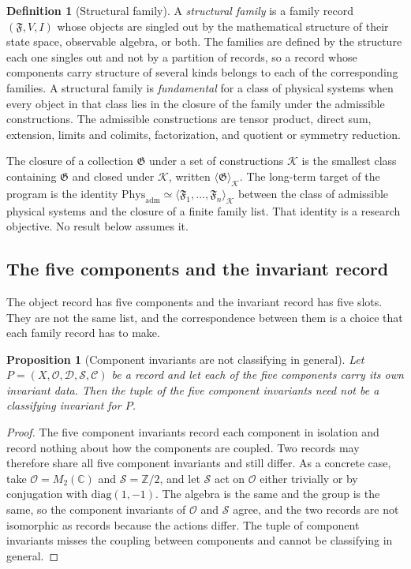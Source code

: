 \documentclass[11pt,letterpaper]{article}
\newtheorem{proposition}[theorem]{Proposition}
\theoremstyle{definition}
\newtheorem{definition}[theorem]{Definition}
\theoremstyle{remark}
\begin{document}
\begin{definition}[Structural family]
\label{def:structural-family}
A \emph{structural family} is a family record $(\mathfrak{F}, V, I)$ whose objects are singled out by the mathematical structure of their state space, observable algebra, or both. The families are defined by the structure each one singles out and not by a partition of records, so a record whose components carry structure of several kinds belongs to each of the corresponding families. A structural family is \emph{fundamental} for a class of physical systems when every object in that class lies in the closure of the family under the admissible constructions. The admissible constructions are tensor product, direct sum, extension, limits and colimits, factorization, and quotient or symmetry reduction.
\end{definition}

The closure of a collection $\mathfrak{G}$ under a set of constructions $\mathcal{K}$ is the smallest class containing $\mathfrak{G}$ and closed under $\mathcal{K}$, written $\langle \mathfrak{G} \rangle_{\mathcal{K}}$. The long-term target of the program is the identity $\mathrm{Phys}_{\mathrm{adm}} \simeq \langle \mathfrak{F}_1, \dots, \mathfrak{F}_n \rangle_{\mathcal{K}}$ between the class of admissible physical systems and the closure of a finite family list. That identity is a research objective. No result below assumes it.

\subsection{The five components and the invariant record}
\label{sec:components}

The object record has five components and the invariant record has five slots. They are not the same list, and the correspondence between them is a choice that each family record has to make.

\begin{proposition}[Component invariants are not classifying in general]
\label{prop:components}
Let $P = (X, \mathcal{O}, \mathcal{D}, \mathcal{S}, \mathcal{C})$ be a record and let each of the five components carry its own invariant data. Then the tuple of the five component invariants need not be a classifying invariant for $P$.
\end{proposition}

\begin{proof}
The five component invariants record each component in isolation and record nothing about how the components are coupled. Two records may therefore share all five component invariants and still differ. As a concrete case, take $\mathcal{O} = M_2(\mathbb{C})$ and $\mathcal{S} = \mathbb{Z}/2$, and let $\mathcal{S}$ act on $\mathcal{O}$ either trivially or by conjugation with $\mathrm{diag}(1,-1)$. The algebra is the same and the group is the same, so the component invariants of $\mathcal{O}$ and $\mathcal{S}$ agree, and the two records are not isomorphic as records because the actions differ. The tuple of component invariants misses the coupling between components and cannot be classifying in general.
\end{proof}
\end{document}
